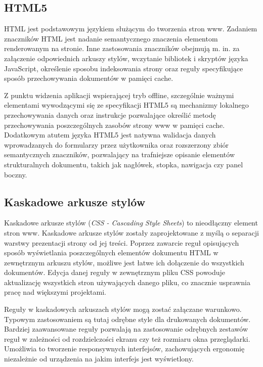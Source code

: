 \subsection{HTML5}
\label{sec:html5}

HTML jest podstawowym językiem służącym do tworzenia stron www. Zadaniem znaczników HTML jest nadanie semantycznego znaczenia elementom renderowanym na stronie. Inne zastosowania znaczników obejmują m. in. za załączenie odpowiednich arkuszy stylów, wczytanie bibliotek i skryptów języka JavaScript, określenie sposobu indeksowania strony oraz reguły specyfikujące sposób przechowywania dokumentów w pamięci cache.

Z punktu widzenia aplikacji wspierającej tryb offline, szczególnie ważnymi elementami wywodzącymi się ze specyfikacji HTML5 są mechanizmy lokalnego przechowywania danych oraz instrukcje pozwalające określić metodę przechowywania poszczególnych zasobów strony www w pamięci cache. Dodatkowym atutem języka HTML5 jest natywna walidacja danych wprowadzanych do formularzy przez użytkownika oraz rozszerzony zbiór semantycznych znaczników, pozwalający na trafniejsze opisanie elementów strukturalnych dokumentu, takich jak nagłówek, stopka, nawigacja czy panel boczny.

\subsection{Kaskadowe arkusze stylów}
\label{sec:css}

Kaskadowe arkusze stylów (\emph{CSS - Cascading Style Sheets}) to nieodłączny element stron www. Kaskadowe arkusze stylów zostały zaprojektowane z myślą o separacji warstwy prezentacji strony od jej treści. Poprzez zawarcie reguł opisujących sposób wyświetlania poszczególnych elementów dokumentu HTML w zewnętrznym arkuszu stylów, możliwe jest łatwe ich dołączenie do wszystkich dokumentów. Edycja danej reguły w zewnętrznym pliku CSS powoduje aktualizację wszystkich stron używających danego pliku, co znacznie usprawnia pracę nad większymi projektami.

Reguły w kaskadowych arkuszach stylów mogą zostać załączane warunkowo. Typowym zastosowaniem są tutaj odrębne style dla drukowanych dokumentów. Bardziej zaawansowane reguły pozwalają na zastosowanie odrębnych zestawów reguł w zależności od rozdzielczości ekranu czy też rozmiaru okna przeglądarki. Umożliwia to tworzenie responsywnych interfejsów, zachowujących ergonomię niezależnie od urządzenia na jakim interfejs jest wyświetlony.

